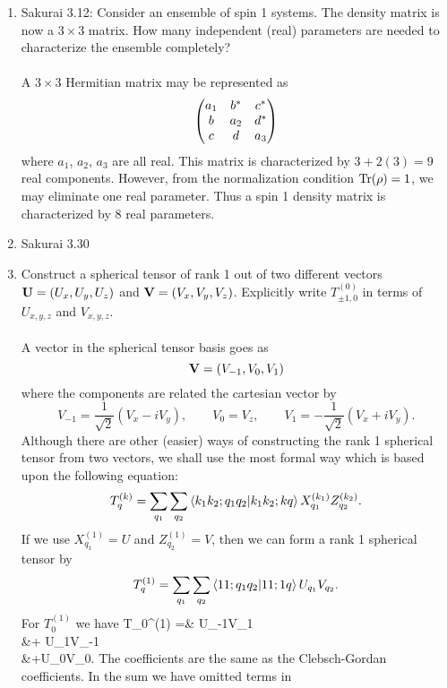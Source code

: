 \documentclass[11pt,letterpaper]{article}
\begin{document}
\begin{enumerate}[label=\Roman*.]
	\item
	Sakurai 3.12: Consider an ensemble of spin 1 systems. The density matrix is now a $3\times3$ matrix. How many independent (real) 
	parameters are needed to characterize the ensemble completely?
	\\
	\\
	A $3\times 3$ Hermitian matrix may be represented as
	\[
		\begin{pmatrix} a_1&b^*&c^*\\b&a_2&d^*\\c&d&a_3 \end{pmatrix}
	\]
	where $a_1$, $a_2$, $a_3$ are all real. This matrix is characterized by $3+2(3) = 9$ real components. However, 
	from the normalization condition $\text{Tr}(\rho) = 1$, we may eliminate one real parameter. Thus a spin 1 density matrix
	is characterized by 8 real parameters. 
	\\
	\item 
	Sakurai 3.30
	\benum
		\item
		Construct a spherical tensor of rank 1 out of two different vectors $\mathbf{U} = (U_x,U_y,U_z)$ and
		$\mathbf{V} = (V_x,V_y,V_z)$. Explicitly write $T^{(0)}_{\pm1,0}$ in terms of $U_{x,y,z}$ and $V_{x,y,z}$.
		\\
		\\
		A vector in the spherical tensor basis goes as
		\[
			\mathbf{V} = (V_{-1},V_0,V_{1})
		\]
		where the components are related the cartesian vector by
		\[
			V_{-1} = \frac{1}{\sqrt 2}(V_x-iV_y),\qquad V_0 = V_z,\qquad V_1 = -\frac{1}{\sqrt 2}(V_x+iV_y).
		\]
		Although there are other (easier) ways of constructing the rank 1 spherical tensor from two vectors, we shall
		use the most formal way which is based upon the following equation:
		\[
			T_q^{(k)} = \sum_{q_1}\sum_{q_2}\braket{k_1k_2;q_1q_2|k_1k_2;kq}X_{q_1}^{(k_1)}Z_{q_2}^{(k_2)}.
		\]
		If we use $X^{(1)}_{q_1} = U$ and $Z_{q_2}^{(1)} = V$, then we can form a rank 1 spherical tensor by
		\[
			T^{(1)}_q = \sum_{q_1}\sum_{q_2}\braket{11;q_1q_2|11;1q}U_{q_1}V_{q_2}.
		\]
		For $T^{(1)}_{0}$ we have
		\ba
			T_0^{(1)} =& U_{-1}V_1 \\
			&+ U_{1}V_{-1}\\
			&+U_{0}V_0.
		\ea
		The coefficients are the same as the Clebsch-Gordan coefficients. In the sum we have omitted terms in 

\end{enumerate}
\end{document}
